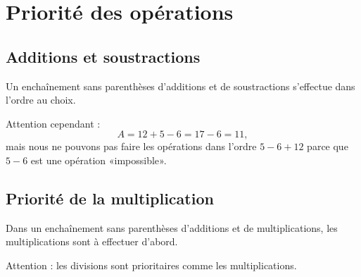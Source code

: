 


\section{Priorité des opérations}

\subsection{Additions et soustractions}

\begin{Aretenir}
    Un enchaînement sans parenthèses d'additions et de soustractions s'effectue dans l'ordre au choix.
\end{Aretenir}

Attention cependant :
\begin{equation}
    A=12+5-6=17-6=11,
\end{equation}
mais nous ne pouvons pas faire les opérations dans l'ordre \( 5-6+12\) parce que \( 5-6\) est une opération «impossible».

\subsection{Priorité de la multiplication}

\begin{Aretenir}
    Dans un enchaînement sans parenthèses d'additions et de multiplications, les multiplications sont à effectuer d'abord.

    Attention : les divisions sont prioritaires comme les multiplications.
\end{Aretenir}

